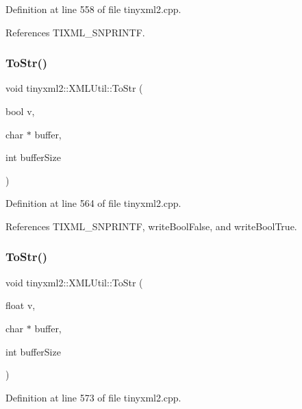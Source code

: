 Definition at line 558 of file tinyxml2.\+cpp.



References T\+I\+X\+M\+L\+\_\+\+S\+N\+P\+R\+I\+N\+TF.

\mbox{\label{classtinyxml2_1_1_x_m_l_util_adba0718527ae9e80f663a71ea325cb11}} 
\subsubsection{ToStr()\hspace{0.1cm}{\footnotesize\ttfamily [3/6]}}
{\footnotesize\ttfamily void tinyxml2\+::\+X\+M\+L\+Util\+::\+To\+Str (\begin{DoxyParamCaption}\item[{bool}]{v,  }\item[{char $\ast$}]{buffer,  }\item[{int}]{buffer\+Size }\end{DoxyParamCaption})\hspace{0.3cm}{\ttfamily [static]}}



Definition at line 564 of file tinyxml2.\+cpp.



References T\+I\+X\+M\+L\+\_\+\+S\+N\+P\+R\+I\+N\+TF, write\+Bool\+False, and write\+Bool\+True.

\mbox{\label{classtinyxml2_1_1_x_m_l_util_a8957ad44fee5fa02ba52d73aad4d0a31}} 
\subsubsection{ToStr()\hspace{0.1cm}{\footnotesize\ttfamily [4/6]}}
{\footnotesize\ttfamily void tinyxml2\+::\+X\+M\+L\+Util\+::\+To\+Str (\begin{DoxyParamCaption}\item[{float}]{v,  }\item[{char $\ast$}]{buffer,  }\item[{int}]{buffer\+Size }\end{DoxyParamCaption})\hspace{0.3cm}{\ttfamily [static]}}



Definition at line 573 of file tinyxml2.\+cpp.



